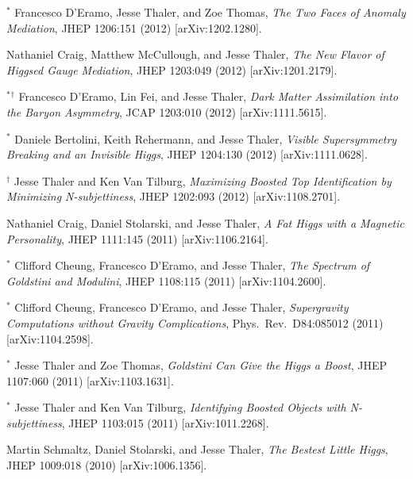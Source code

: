 \begin{list}{[]\addtocounter{jessecount}{-1}}{\leftmargin=3em \itemsep=4pt}
\item
${}^\ast$ Francesco D'Eramo, Jesse Thaler, and Zoe Thomas,
\emph{The Two Faces of Anomaly Mediation},
JHEP 1206:151 (2012)
[arXiv:1202.1280].

\item
 Nathaniel Craig, Matthew McCullough, and Jesse Thaler,
\emph{The New Flavor of Higgsed Gauge Mediation},
JHEP 1203:049 (2012)
[arXiv:1201.2179].

\item
${}^\ast$${}^\dagger$ Francesco D'Eramo, Lin Fei, and Jesse Thaler,
\emph{Dark Matter Assimilation into the Baryon Asymmetry},
JCAP 1203:010 (2012)
[arXiv:1111.5615].

\item
${}^\ast$ Daniele Bertolini, Keith Rehermann, and Jesse Thaler,
\emph{Visible Supersymmetry Breaking and an Invisible Higgs},
JHEP 1204:130 (2012)
[arXiv:1111.0628].

\item
${}^\dagger$ Jesse Thaler and Ken Van Tilburg,
\emph{Maximizing Boosted Top Identification by Minimizing N-subjettiness},
JHEP 1202:093 (2012)
[arXiv:1108.2701].

\item
 Nathaniel Craig, Daniel Stolarski, and Jesse Thaler,
\emph{A Fat Higgs with a Magnetic Personality},
JHEP 1111:145 (2011)
[arXiv:1106.2164].

\item
${}^\ast$ Clifford Cheung, Francesco D'Eramo, and Jesse Thaler,
\emph{The Spectrum of Goldstini and Modulini},
JHEP 1108:115 (2011)
[arXiv:1104.2600].

\item
${}^\ast$ Clifford Cheung, Francesco D'Eramo, and Jesse Thaler,
\emph{Supergravity Computations without Gravity Complications},
Phys.\ Rev.\ D84:085012 (2011)
[arXiv:1104.2598].

\item
${}^\ast$ Jesse Thaler and Zoe Thomas,
\emph{Goldstini Can Give the Higgs a Boost},
JHEP 1107:060 (2011)
[arXiv:1103.1631].

\item
${}^\ast$ Jesse Thaler and Ken Van Tilburg,
\emph{Identifying Boosted Objects with N-subjettiness},
JHEP 1103:015 (2011)
[arXiv:1011.2268].

\item
 Martin Schmaltz, Daniel Stolarski, and Jesse Thaler,
\emph{The Bestest Little Higgs},
JHEP 1009:018 (2010)
[arXiv:1006.1356].


\end{list}
